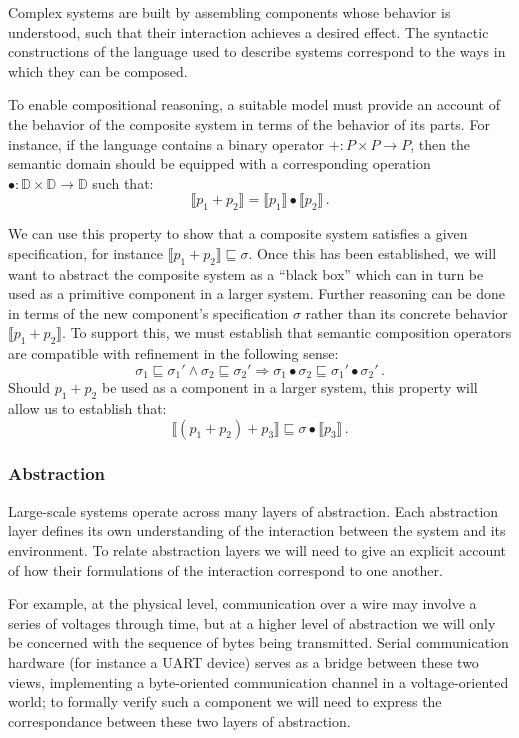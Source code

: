 \documentclass{article}
\begin{document}
Complex systems are built by assembling components
whose behavior is understood,
such that their interaction achieves a desired effect.
The syntactic constructions of
the language used to describe systems
correspond to the ways in which they can be composed.

To enable compositional reasoning,
a suitable model must provide an account of
the behavior of the composite system
in terms of the behavior of its parts.
For instance,
if the language contains a binary operator
${+} : P \times P \rightarrow P$,
then the semantic domain should be equipped with
a corresponding operation
${\bullet} : \mathbb{D} \times \mathbb{D} \rightarrow \mathbb{D}$
such that:
\[ \llbracket p_1 + p_2 \rrbracket =
   \llbracket p_1 \rrbracket \bullet \llbracket p_2 \rrbracket \,. \]

We can use this property
to show that a composite system
satisfies a given specification,
for instance
$\llbracket p_1 + p_2 \rrbracket \sqsubseteq \sigma$.
Once this has been established,
we will want to abstract the composite system as a ``black box''
which can in turn be used as a primitive component in a larger system.
Further reasoning can be done in terms of
the new component's specification $\sigma$ rather than
its concrete behavior $\llbracket p_1 + p_2 \rrbracket$.
To support this,
we must establish that semantic composition operators
are compatible with refinement in the following sense:
\[ \sigma_1 \sqsubseteq \sigma_1' \wedge
   \sigma_2 \sqsubseteq \sigma_2' \Rightarrow
   \sigma_1 \bullet \sigma_2 \sqsubseteq \sigma_1' \bullet \sigma_2' \,. \]
Should $p_1 + p_2$ be used as a component in a larger system,
this property will allow us to establish that:
\[ \llbracket (p_1 + p_2) + p_3 \rrbracket \sqsubseteq
   \sigma \bullet \llbracket p_3 \rrbracket \,. \]

\subsubsection{Abstraction}

Large-scale systems operate across many layers of abstraction.
Each abstraction layer defines its own understanding of the interaction
between the system and its environment.
To relate abstraction layers we will need to give an explicit account
of how their formulations of the interaction correspond to one another.

For example,
at the physical level,
communication over a wire may involve a series of voltages through time,
but at a higher level of abstraction
we will only be concerned with the sequence of bytes
being transmitted.
Serial communication hardware (for instance a UART device)
serves as a bridge between these two views,
implementing a byte-oriented communication channel
in a voltage-oriented world;
to formally verify such a component we will need to
express the correspondance between these two
layers of abstraction.
\end{document}
